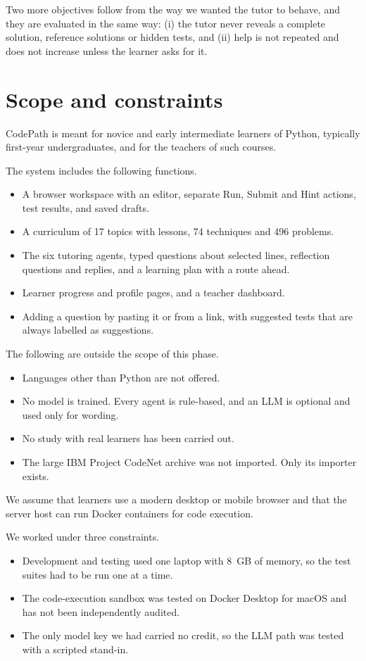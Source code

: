 Two more objectives follow from the way we wanted the tutor to behave, and they are evaluated in the same way: (i) the tutor never reveals a complete solution, reference solutions or hidden tests, and (ii) help is not repeated and does not increase unless the learner asks for it.

\section{Scope and constraints}
CodePath is meant for novice and early intermediate learners of Python, typically first-year undergraduates, and for the teachers of such courses.

The system includes the following functions.
\begin{itemize}
\item A browser workspace with an editor, separate Run, Submit and Hint actions, test results, and saved drafts.
\item A curriculum of 17 topics with lessons, 74 techniques and 496 problems.
\item The six tutoring agents, typed questions about selected lines, reflection questions and replies, and a learning plan with a route ahead.
\item Learner progress and profile pages, and a teacher dashboard.
\item Adding a question by pasting it or from a link, with suggested tests that are always labelled as suggestions.
\end{itemize}

The following are outside the scope of this phase.
\begin{itemize}
\item Languages other than Python are not offered.
\item No model is trained. Every agent is rule-based, and an LLM is optional and used only for wording.
\item No study with real learners has been carried out.
\item The large IBM Project CodeNet archive was not imported. Only its importer exists.
\end{itemize}

We assume that learners use a modern desktop or mobile browser and that the server host can run Docker containers for code execution.

We worked under three constraints.
\begin{itemize}
\item Development and testing used one laptop with 8~GB of memory, so the test suites had to be run one at a time.
\item The code-execution sandbox was tested on Docker Desktop for macOS and has not been independently audited.
\item The only model key we had carried no credit, so the LLM path was tested with a scripted stand-in.
\end{itemize}

